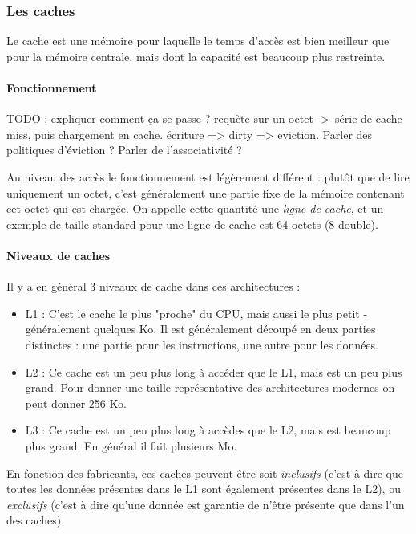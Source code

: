 \subsubsection{Les caches}
Le cache est une mémoire pour laquelle le temps d'accès est bien meilleur que pour la mémoire centrale, mais dont la capacité est beaucoup plus restreinte.

\paragraph{Fonctionnement}

TODO : expliquer comment ça se passe ? requète sur un octet -> série de cache miss, puis chargement en cache.
écriture => dirty => eviction.
Parler des politiques d'éviction ?
Parler de l'associativité ?

Au niveau des accès le fonctionnement est légèrement différent : plutôt que de lire uniquement un octet, c'est généralement une partie fixe de la mémoire contenant cet octet qui est chargée.
On appelle cette quantité une \emph{ligne de cache}, et un exemple de taille standard pour une ligne de cache est 64 octets (8 double).

\paragraph{Niveaux de caches}

Il y a en général 3 niveaux de cache dans ces architectures :
\begin{itemize}
  \item L1 : C'est le cache le plus "proche" du CPU, mais aussi le plus petit - généralement quelques Ko. Il est généralement découpé en deux parties distinctes : une partie pour les instructions, une autre pour les données.
  \item L2 : Ce cache est un peu plus long à accéder que le L1, mais est un peu plus grand. Pour donner une taille représentative des architectures modernes on peut donner 256 Ko.
  \item L3 : Ce cache est un peu plus long à accèdes que le L2, mais est beaucoup plus grand. En général il fait plusieurs Mo.
\end{itemize}

En fonction des fabricants, ces caches peuvent être soit \emph{inclusifs} (c'est à dire que toutes les données présentes dans le L1 sont également présentes dans le L2), ou \emph{exclusifs} (c'est à dire qu'une donnée est garantie de n'être présente que dans l'un des caches).


